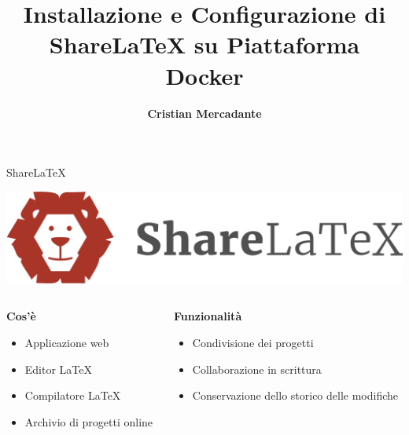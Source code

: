 \documentclass[aspectratio=169]{beamer}
\author{\textbf{Cristian Mercadante}}
\title[Installazione e Configurazione di ShareLaTeX]{Installazione e Configurazione di\\ShareLaTeX su Piattaforma Docker}
\institute{\small
\textbf{Relatore:}\\
Prof. Costantino Grana\\
\textbf{Correlatore:}\\
Dott. Federico Bolelli
}
\date{}
\begin{document}
\begin{frame}
    \titlepage
\end{frame}

\begin{frame}{ShareLaTeX}
    \begin{center}
        \includegraphics[scale=0.25]{img/sharelatex_logo.png}
    \end{center}
    \begin{columns}[T]
        \begin{column}{0.5\textwidth}
            \textbf{Cos'è}
            \begin{itemize}
                \item Applicazione web
                \item Editor \LaTeX
                \item Compilatore \LaTeX
                \item Archivio di progetti online
            \end{itemize}
        \end{column}
        \begin{column}{0.5\textwidth}
            \textbf{Funzionalità}
            \begin{itemize}
                \item Condivisione dei progetti
                \item Collaborazione in scrittura
                \item Conservazione dello storico delle modifiche
            \end{itemize}
        \end{column}
    \end{columns}
\end{frame}
\end{document}
